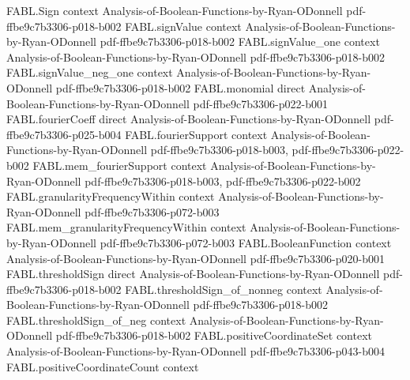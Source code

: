 \begin{theorem}
\label{FABL.totalInfluence_eq_expect_norm_discreteGradient_sq}
\leanok
{}
\proofstep
  {FABL.Sign}
  {context}
  {Analysis-of-Boolean-Functions-by-Ryan-ODonnell}
  {pdf-ffbe9c7b3306-p018-b002}
\proofstep
  {FABL.signValue}
  {context}
  {Analysis-of-Boolean-Functions-by-Ryan-ODonnell}
  {pdf-ffbe9c7b3306-p018-b002}
\proofstep
  {FABL.signValue_one}
  {context}
  {Analysis-of-Boolean-Functions-by-Ryan-ODonnell}
  {pdf-ffbe9c7b3306-p018-b002}
\proofstep
  {FABL.signValue_neg_one}
  {context}
  {Analysis-of-Boolean-Functions-by-Ryan-ODonnell}
  {pdf-ffbe9c7b3306-p018-b002}
\proofstep
  {FABL.monomial}
  {direct}
  {Analysis-of-Boolean-Functions-by-Ryan-ODonnell}
  {pdf-ffbe9c7b3306-p022-b001}
\proofstep
  {FABL.fourierCoeff}
  {direct}
  {Analysis-of-Boolean-Functions-by-Ryan-ODonnell}
  {pdf-ffbe9c7b3306-p025-b004}
\proofstep
  {FABL.fourierSupport}
  {context}
  {Analysis-of-Boolean-Functions-by-Ryan-ODonnell}
  {pdf-ffbe9c7b3306-p018-b003,
    pdf-ffbe9c7b3306-p022-b002}
\proofstep
  {FABL.mem_fourierSupport}
  {context}
  {Analysis-of-Boolean-Functions-by-Ryan-ODonnell}
  {pdf-ffbe9c7b3306-p018-b003,
    pdf-ffbe9c7b3306-p022-b002}
\proofstep
  {FABL.granularityFrequencyWithin}
  {context}
  {Analysis-of-Boolean-Functions-by-Ryan-ODonnell}
  {pdf-ffbe9c7b3306-p072-b003}
\proofstep
  {FABL.mem_granularityFrequencyWithin}
  {context}
  {Analysis-of-Boolean-Functions-by-Ryan-ODonnell}
  {pdf-ffbe9c7b3306-p072-b003}
\proofstep
  {FABL.BooleanFunction}
  {context}
  {Analysis-of-Boolean-Functions-by-Ryan-ODonnell}
  {pdf-ffbe9c7b3306-p020-b001}
\proofstep
  {FABL.thresholdSign}
  {direct}
  {Analysis-of-Boolean-Functions-by-Ryan-ODonnell}
  {pdf-ffbe9c7b3306-p018-b002}
\proofstep
  {FABL.thresholdSign_of_nonneg}
  {context}
  {Analysis-of-Boolean-Functions-by-Ryan-ODonnell}
  {pdf-ffbe9c7b3306-p018-b002}
\proofstep
  {FABL.thresholdSign_of_neg}
  {context}
  {Analysis-of-Boolean-Functions-by-Ryan-ODonnell}
  {pdf-ffbe9c7b3306-p018-b002}
\proofstep
  {FABL.positiveCoordinateSet}
  {context}
  {Analysis-of-Boolean-Functions-by-Ryan-ODonnell}
  {pdf-ffbe9c7b3306-p043-b004}
\proofstep
  {FABL.positiveCoordinateCount}
  {context}

\end{theorem}
